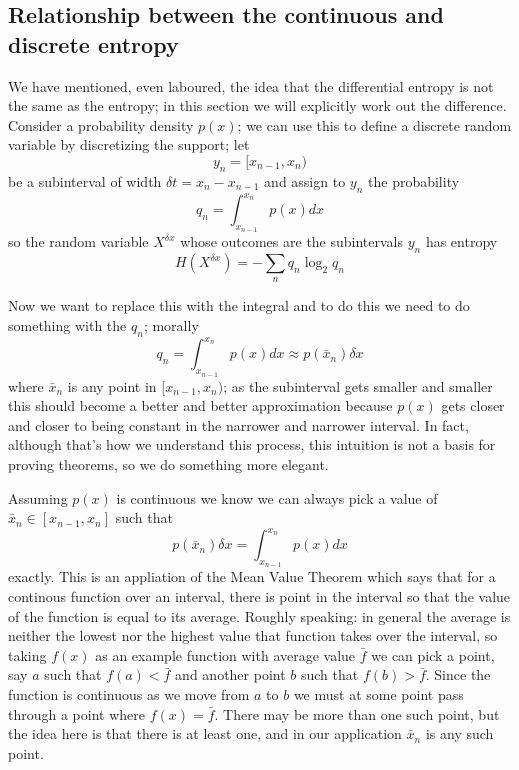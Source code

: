 \documentclass[12pt]{article}
\begin{document}
\subsection*{Relationship between the continuous and discrete entropy}

We have mentioned, even laboured, the idea that the differential
entropy is not the same as the entropy; in this section we will
explicitly work out the difference. Consider a probability density
$p(x)$; we can use this to define a discrete random variable by discretizing the support; let
\begin{equation}
  y_n=[x_{n-1},x_n)
\end{equation}
be a subinterval of width $\delta t=x_n-x_{n-1}$ and assign to $y_n$ the probability
\begin{equation}
  q_n=\int_{x_{n-1}}^{x_n}p(x)dx
\end{equation}
so the random variable $X^{\delta x}$ whose outcomes are the subintervals $y_n$ has entropy
\begin{equation}
  H(X^{\delta x})=-\sum_n q_n \log_2{q_n}
\end{equation}

Now we want to replace this with the integral and to do this we need to do something with the $q_n$; morally
\begin{equation}\label{HY}
  q_n=\int_{x_{n-1}}^{x_n}p(x)dx\approx p(\bar{x}_n)\delta x
\end{equation}
where $\bar{x}_n$ is any point in $[x_{n-1},x_n)$; as the subinterval
  gets smaller and smaller this should become a better and better
  approximation because $p(x)$ gets closer and closer to being
  constant in the narrower and narrower interval. In fact, although
  that's how we understand this process, this intuition is not a basis
  for proving theorems, so we do something more elegant.

Assuming $p(x)$ is continuous we know we can
always pick a value of $\bar{x}_n\in[x_{n-1},x_n]$ such that
\begin{equation}
  p(\bar{x}_n)\delta x=\int_{x_{n-1}}^{x_n}p(x)dx
  \end{equation}
exactly. This is an appliation of the Mean Value Theorem which says
that for a continous function over an interval, there is point in the
interval so that the value of the function is equal to its
average. Roughly speaking: in general the average is neither the
lowest nor the highest value that function takes over the interval, so
taking $f(x)$ as an example function with average value $\bar{f}$ we
can pick a point, say $a$ such that $f(a)<\bar{f}$ and another point
$b$ such that $f(b)>\bar{f}$. Since the function is continuous as we
move from $a$ to $b$ we must at some point pass through a point where
$f(x)=\bar{f}$. There may be more than one such point, but the idea
here is that there is at least one, and in our application $\bar{x}_n$
is any such point.
\end{document}
